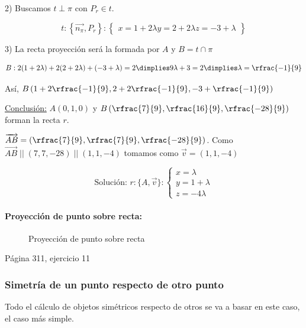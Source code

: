 \begin{problem}
2) Buscamos $t\perp\pi$ con $P_r\in t$. 

\[
t:\left\{\vec{n_{\pi}},P_r \right\}:\left\{
\begin{array}{c}
x=1+2\lambda
y=2+2\lambda
z=-3+\lambda
\end{array}
\right\}
\]

3) La recta proyección será la formada por $A$ y $B=t\cap\pi$ 

\[
B: 2(1+2\lambda)+2(2+2\lambda)+(-3+\lambda)=2 \dimplies 9\lambda+3=2\dimplies \lambda=\rfrac{-1}{9}
\]

Así, $B\left(1+2\rfrac{-1}{9},2+2\rfrac{-1}{9},-3+\rfrac{-1}{9}\right)$ 

\ul{Conclusión:}
$A (0,1,0)$ y $B\left(\rfrac{7}{9},\rfrac{16}{9},\rfrac{-28}{9}\right)$ forman la recta $r$.


$\vec{AB} = \left(\rfrac{7}{9},\rfrac{7}{9},\rfrac{-28}{9}\right)$. Como $\vec{AB} \;||\; (7,7,-28) \;||\; (1,1,-4)$ tomamos como $\vec{v} = (1,1,-4)$

\[
\text{Solución: }r:\{A,\vec{v}\}:
\left\{\begin{array}{l}
x=\lambda\\
y=1+\lambda\\
z=-4\lambda
\end{array}
\right.
\]
\end{problem}



\paragraph{Proyección de punto sobre recta:}

\begin{figure}[H]
\centering
{}

\caption{Proyección de punto sobre recta}
\label{fig::proy::punto-recta}
\end{figure}


\begin{problem}
Página 311, ejercicio 11
\solution
\end{problem}

\subsubsection{Simetría de un punto respecto de otro punto}

Todo el cálculo de objetos simétricos respecto de otros se va a basar en este caso, el caso más simple.

